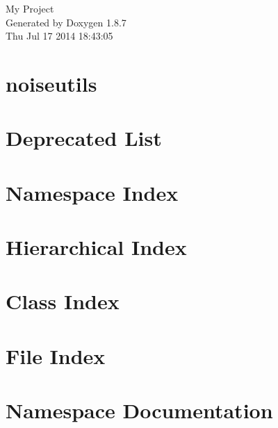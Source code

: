 \documentclass[twoside]{book}
\newcommand{\+}{\discretionary{\mbox{\scriptsize$\hookleftarrow$}}{}{}}
\newcommand{\clearemptydoublepage}{%
  \newpage{\pagestyle{empty}\cleardoublepage}%
}
\begin{document}
\hypersetup{pageanchor=false,
             bookmarks=true,
             bookmarksnumbered=true,
             pdfencoding=unicode
            }
\begin{titlepage}
\vspace*{7cm}
\begin{center}%
{\Large My Project }\\
\vspace*{1cm}
{\large Generated by Doxygen 1.8.7}\\
\vspace*{0.5cm}
{\small Thu Jul 17 2014 18:43:05}\\
\end{center}
\end{titlepage}
\clearemptydoublepage
\tableofcontents
\clearemptydoublepage
{}
\hypersetup{pageanchor=true}

\chapter{noiseutils}
\label{index}\hypertarget{index}{}
\chapter{Deprecated List}
\label{deprecated}
\hypertarget{deprecated}{}

\chapter{Namespace Index}

\chapter{Hierarchical Index}

\chapter{Class Index}

\chapter{File Index}

\chapter{Namespace Documentation}








\end{document}
